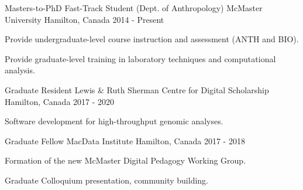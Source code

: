 

\begin{cventries}


  \cventry
    {Masters-to-PhD Fast-Track Student (Dept. of Anthropology)} %
    {McMaster University} %
    {Hamilton, Canada} %
    {2014 - Present} %
    {
      \begin{cvitems} %
        \item {Provide undergraduate-level course instruction and assessment (ANTH and BIO).}
        \item {Provide graduate-level training in laboratory techniques and computational analysis.}
      \end{cvitems}
    }
    
  \cventry
    {Graduate Resident} %
    {Lewis \& Ruth Sherman Centre for Digital Scholarship} %
    {Hamilton, Canada} %
    {2017 - 2020} %
    {
      \begin{cvitems} %
        \item {Software development for high-throughput genomic analyses.}
      \end{cvitems}
    }
    
  \cventry
    {Graduate Fellow} %
    {MacData Institute} %
    {Hamilton, Canada} %
    {2017 - 2018} %
    {
      \begin{cvitems} %
        \item {Formation of the new McMaster Digital Pedagogy Working Group.}
        \item {Graduate Colloquium presentation, community building.}
      \end{cvitems}
    }    



\end{cventries}
